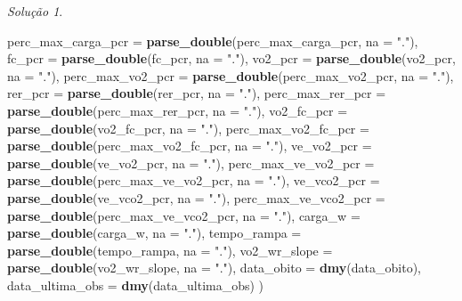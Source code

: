 \documentclass[
]{latex/krantz}
\newenvironment{Shaded}{\begin{snugshade}}{\end{snugshade}}
\newcommand{\AttributeTok}[1]{\textcolor[rgb]{0.13,0.29,0.53}{#1}}
\newcommand{\FunctionTok}[1]{\textcolor[rgb]{0.13,0.29,0.53}{\textbf{#1}}}
\newcommand{\NormalTok}[1]{#1}
\newcommand{\StringTok}[1]{\textcolor[rgb]{0.31,0.60,0.02}{#1}}
\theoremstyle{definition}
\theoremstyle{definition}
\theoremstyle{definition}
\theoremstyle{definition}
\theoremstyle{remark}
\newtheorem*{solution}{Solução}
\begin{document}
\begin{solution}
\begin{Shaded}
\begin{Highlighting}[]
                \AttributeTok{perc\_max\_carga\_pcr =} \FunctionTok{parse\_double}\NormalTok{(perc\_max\_carga\_pcr, }\AttributeTok{na =} \StringTok{"."}\NormalTok{),}
                \AttributeTok{fc\_pcr =} \FunctionTok{parse\_double}\NormalTok{(fc\_pcr, }\AttributeTok{na =} \StringTok{"."}\NormalTok{),}
                \AttributeTok{vo2\_pcr =} \FunctionTok{parse\_double}\NormalTok{(vo2\_pcr, }\AttributeTok{na =} \StringTok{"."}\NormalTok{),}
                \AttributeTok{perc\_max\_vo2\_pcr =} \FunctionTok{parse\_double}\NormalTok{(perc\_max\_vo2\_pcr, }\AttributeTok{na =} \StringTok{"."}\NormalTok{),}
                \AttributeTok{rer\_pcr =} \FunctionTok{parse\_double}\NormalTok{(rer\_pcr, }\AttributeTok{na =} \StringTok{"."}\NormalTok{),}
                \AttributeTok{perc\_max\_rer\_pcr =} \FunctionTok{parse\_double}\NormalTok{(perc\_max\_rer\_pcr, }\AttributeTok{na =} \StringTok{"."}\NormalTok{),}
                \AttributeTok{vo2\_fc\_pcr =} \FunctionTok{parse\_double}\NormalTok{(vo2\_fc\_pcr, }\AttributeTok{na =} \StringTok{"."}\NormalTok{),}
                \AttributeTok{perc\_max\_vo2\_fc\_pcr =} \FunctionTok{parse\_double}\NormalTok{(perc\_max\_vo2\_fc\_pcr, }\AttributeTok{na =} \StringTok{"."}\NormalTok{),}
                \AttributeTok{ve\_vo2\_pcr =} \FunctionTok{parse\_double}\NormalTok{(ve\_vo2\_pcr, }\AttributeTok{na =} \StringTok{"."}\NormalTok{),}
                \AttributeTok{perc\_max\_ve\_vo2\_pcr =} \FunctionTok{parse\_double}\NormalTok{(perc\_max\_ve\_vo2\_pcr, }\AttributeTok{na =} \StringTok{"."}\NormalTok{),}
                \AttributeTok{ve\_vco2\_pcr =} \FunctionTok{parse\_double}\NormalTok{(ve\_vco2\_pcr, }\AttributeTok{na =} \StringTok{"."}\NormalTok{),}
                \AttributeTok{perc\_max\_ve\_vco2\_pcr =} \FunctionTok{parse\_double}\NormalTok{(perc\_max\_ve\_vco2\_pcr, }\AttributeTok{na =} \StringTok{"."}\NormalTok{),}
                \AttributeTok{carga\_w =} \FunctionTok{parse\_double}\NormalTok{(carga\_w, }\AttributeTok{na =} \StringTok{"."}\NormalTok{),}
                \AttributeTok{tempo\_rampa  =} \FunctionTok{parse\_double}\NormalTok{(tempo\_rampa, }\AttributeTok{na =} \StringTok{"."}\NormalTok{),}
                \AttributeTok{vo2\_wr\_slope  =} \FunctionTok{parse\_double}\NormalTok{(vo2\_wr\_slope, }\AttributeTok{na =} \StringTok{"."}\NormalTok{),}
                \AttributeTok{data\_obito =} \FunctionTok{dmy}\NormalTok{(data\_obito),}
                \AttributeTok{data\_ultima\_obs =} \FunctionTok{dmy}\NormalTok{(data\_ultima\_obs)}
\NormalTok{              )}
\end{Highlighting}
\end{Shaded}


\end{solution}
\end{document}
